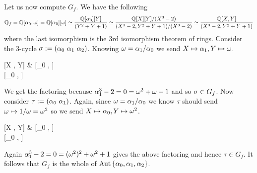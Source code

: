 \documentclass{article}
\begin{document}
Let us now compute $G_f$. We have the following
\begin{align*}
  \mathbb{Q}_f = \mathbb{Q}[\alpha_0 , \omega] 
  = \mathbb{Q}[\alpha_0][\omega]
  \simeq \frac{\mathbb{Q}[\alpha_0][Y]}{(Y^2 + Y + 1)}
  \simeq \frac{\mathbb{Q}[X][Y]/(X^3 - 2)}{(X^3 - 2 , Y^2 + Y + 1)/(X^3 - 2)}
  \simeq \frac{\mathbb{Q}[X , Y]}{(X^3 - 2 , Y^2 + Y + 1)}
\end{align*}
where the last isomorphism is the 3rd isomorphism theorem of rings.
Consider the 3-cycle $\sigma := (\alpha_0 \,\, \alpha_1 \,\, \alpha_2)$.
Knowing $\omega = \alpha_1 / \alpha_0$ we send $X \mapsto \alpha_1 , Y \mapsto \omega$.
\begin{cd}
  {[X , Y]} & {[\alpha_0 , \omega]} \\
	{[\alpha_0 , \omega]}
	\arrow["\begin{array}{c} \begin{matrix}X \mapsto \alpha_1 \\ Y \mapsto \omega\end{matrix} \end{array}", from=1-1, to=1-2]
	\arrow["\begin{array}{c} \begin{matrix}X \mapsto \alpha_0 \\ Y \mapsto \omega\end{matrix} \end{array}"', from=1-1, to=2-1]
	\arrow["\simeq"', dashed, from=2-1, to=1-2]
\end{cd}
We get the factoring because $\alpha_1^3 - 2 = 0 = \omega^2 + \omega + 1$
and so $\sigma \in G_f$.
Now consider $\tau := (\alpha_0 \,\, \alpha_1)$.
Again, since $\omega = \alpha_1 / \alpha_0$ we know 
$\tau$ should send $\omega \mapsto 1 / \omega = \omega^2$ so we send 
$X \mapsto \alpha_0 , Y \mapsto \omega^2$.
\begin{cd}
  {[X , Y]} & {[\alpha_0 , \omega]} \\
	{[\alpha_0 , \omega]}
	\arrow["\begin{array}{c} \begin{matrix}X \mapsto \alpha_1 \\ Y \mapsto \omega^2\end{matrix} \end{array}", from=1-1, to=1-2]
	\arrow["\begin{array}{c} \begin{matrix}X \mapsto \alpha_0 \\ Y \mapsto \omega\end{matrix} \end{array}"', from=1-1, to=2-1]
	\arrow["\simeq"', dashed, from=2-1, to=1-2]
\end{cd}
Again $\alpha_1^3 - 2 = 0 = (\omega^2)^2 + \omega^2 + 1$ gives the above factoring
and hence $\tau \in G_f$.
It follows that $G_f$ is the whole of $\operatorname{Aut}\left\{\alpha_0 , \alpha_1 , \alpha_2\right\}$.
\end{document}
